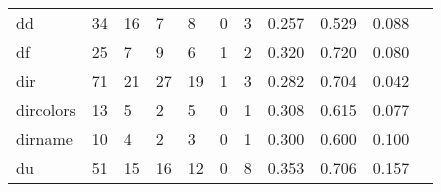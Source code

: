 \begin{longtable}{lp{1.20cm}p{1.20cm}p{1.20cm}p{1.20cm}p{1.20cm}p{1.20cm}p{1.20cm}p{1.20cm}p{1.20cm}p{1.20cm}}
dd        &                                    34 &                                                 16 &                                                  7 &                                                  8 &                                                  0 &                                                  3 &                                         0.257 &                                              0.529 &                                              0.088 \\
df        &                                    25 &                                                  7 &                                                  9 &                                                  6 &                                                  1 &                                                  2 &                                         0.320 &                                              0.720 &                                              0.080 \\
dir       &                                    71 &                                                 21 &                                                 27 &                                                 19 &                                                  1 &                                                  3 &                                         0.282 &                                              0.704 &                                              0.042 \\
dircolors &                                    13 &                                                  5 &                                                  2 &                                                  5 &                                                  0 &                                                  1 &                                         0.308 &                                              0.615 &                                              0.077 \\
dirname   &                                    10 &                                                  4 &                                                  2 &                                                  3 &                                                  0 &                                                  1 &                                         0.300 &                                              0.600 &                                              0.100 \\
du        &                                    51 &                                                 15 &                                                 16 &                                                 12 &                                                  0 &                                                  8 &                                         0.353 &                                              0.706 &                                              0.157 \\

\end{longtable}
